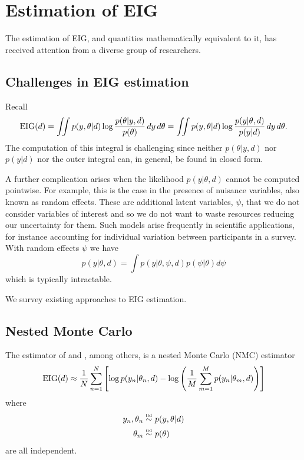 \section{Estimation of EIG}
\label{sec:esteig}
The estimation of EIG, and quantities mathematically equivalent to it, has received attention from a diverse group of researchers.

\subsection{Challenges in EIG estimation}
\label{sec:challenges}
Recall
\begin{align}
	\label{eig:post}
	\text{EIG}(d) =
	\iint  p(y, \theta | d) \log \frac{p(\theta | y, d)}{p(\theta)} \, dy\,  d\theta
	=\iint  p(y, \theta | d) \log \frac{p(y | \theta, d)}{p(y|d)} \, dy\,  d\theta.
\end{align}
The computation of this integral is challenging since neither $p(\theta|y,d)$ nor $p(y|d)$ nor the outer integral can, in general, be found in closed form.

A further complication arises when the likelihood $p(y|\theta,d)$ cannot be computed pointwise. For example, this is the case in the presence of nuisance variables, also known as random effects. 
These are additional latent variables, $\psi$, that we do not consider variables of interest and so we do not want to waste resources reducing our uncertainty for them. 
Such models arise frequently in scientific applications, for instance accounting for individual variation between participants in a survey. With random effects $\psi$ we have
\begin{equation}
	p(y|\theta, d) = \int p(y|\theta, \psi, d) p(\psi | \theta) d\psi
\end{equation}
which is typically intractable.

We survey existing approaches to EIG estimation.

\subsection{Nested Monte Carlo}
\label{sec:nmc}
The estimator of \cite{vincent2017} and \cite{myung2013}, among others, is a nested Monte Carlo (NMC) estimator
\begin{equation}
	\text{EIG}(d) \approx \frac{1}{N}\sum_{n=1}^N \left[ \log p(y_n | \theta_n, d) - \log \left(\frac{1}{M} \sum_{m=1}^M p(y_n | \theta_m, d) \right) \right]
\end{equation}
where
\begin{align}
	y_n, \theta_n \overset{\text{\tiny iid}}{\sim} & \ p(y, \theta | d) \\
	\theta_m \overset{\text{\tiny iid}}{\sim} & \ p(\theta)
\end{align}
are all independent.

